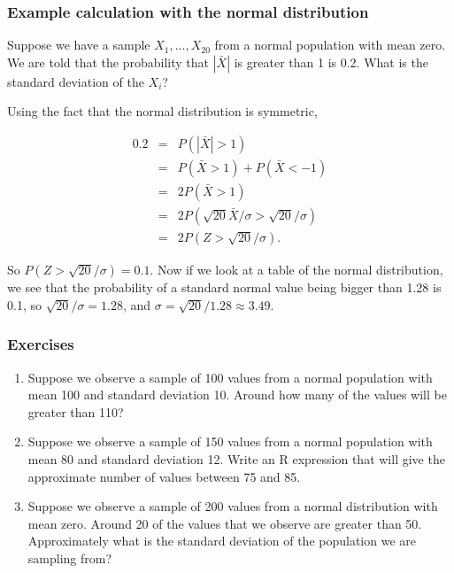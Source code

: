 \begin{frame}
\frametitle{Example calculation with the normal distribution}

Suppose we have a sample $X_1, \ldots, X_{20}$ from a normal
population with mean zero.  We are told that the probability that
$|\bar{X}|$ is greater than 1 is 0.2.  What is the standard deviation
of the $X_i$?

Using the fact that the normal distribution is symmetric,

\begin{eqnarray*}
0.2 &=& P(|\bar{X}| > 1)\\ &=& P(\bar{X}>1) + P(\bar{X}<-1)\\ &=&
2P(\bar{X}>1)\\ &=&
2P(\sqrt{20}\bar{X}/\sigma>\sqrt{20}/\sigma)\\ &=& 2P(Z >
\sqrt{20}/\sigma).
\end{eqnarray*}

So $P(Z > \sqrt{20}/\sigma) = 0.1$.  Now if we look at a table of the
normal distribution, we see that the probability of a standard normal
value being bigger than 1.28 is 0.1, so $\sqrt{20}/\sigma = 1.28$, and
$\sigma = \sqrt{20}/1.28 \approx 3.49$.

\end{frame}


\begin{frame}
\frametitle{Exercises}

\begin{enumerate}

\item Suppose we observe a sample of 100 values from a normal
 population with mean 100 and standard deviation 10.  Around how many
 of the values will be greater than 110?

\item Suppose we observe a sample of 150 values from a normal
 population with mean 80 and standard deviation 12.  Write an R
 expression that will give the approximate number of values between
 75 and 85.

\item Suppose we observe a sample of 200 values from a normal
 distribution with mean zero.  Around 20 of the values that we
 observe are greater than 50.  Approximately what is the standard
 deviation of the population we are sampling from?

\end{enumerate}

\end{frame}


